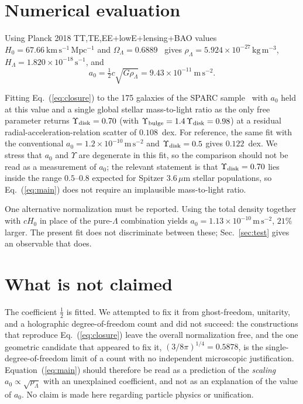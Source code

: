 \documentclass[aps,prd,reprint,amsmath,amssymb,nofootinbib,superscriptaddress]{revtex4-2}
\begin{document}
\section{Numerical evaluation}
\label{sec:num}

Using Planck 2018 TT,TE,EE+lowE+lensing+BAO values $H_0 = 67.66\ \mathrm{km\,s^{-1}\,Mpc^{-1}}$ and
$\Omega_\Lambda = 0.6889$~\cite{Planck2018} gives
$\rho_\Lambda = 5.924\times10^{-27}\,\mathrm{kg\,m^{-3}}$, $H_\Lambda = 1.820\times10^{-18}\,\mathrm{s^{-1}}$,
and
\begin{equation}
a_0 = \tfrac12 c\sqrt{G\rho_\Lambda} = 9.43\times10^{-11}\ \mathrm{m\,s^{-2}} .
\end{equation}

Fitting Eq.~(\ref{eq:closure}) to the 175 galaxies of the SPARC sample~\cite{SPARC} with $a_0$ held at
this value and a single global stellar mass-to-light ratio as the only free parameter returns
$\Upsilon_{\rm disk} = 0.70$ (with $\Upsilon_{\rm bulge} = 1.4\,\Upsilon_{\rm disk} = 0.98$) at a
residual radial-acceleration-relation scatter of $0.108$~dex. For reference, the same fit with the
conventional $a_0 = 1.2\times10^{-10}\,\mathrm{m\,s^{-2}}$ and $\Upsilon_{\rm disk} = 0.5$ gives
$0.122$~dex. We stress that $a_0$ and $\Upsilon$ are degenerate in this fit, so the comparison should
not be read as a measurement of $a_0$; the relevant statement is that
$\Upsilon_{\rm disk} = 0.70$ lies inside the range $0.5$--$0.8$ expected for Spitzer $3.6\,\mu$m
stellar populations, so Eq.~(\ref{eq:main}) does not require an implausible mass-to-light ratio.

One alternative normalization must be reported. Using the total density together with $cH_0$ in place of
the pure-$\Lambda$ combination yields $a_0 = 1.13\times10^{-10}\,\mathrm{m\,s^{-2}}$, $21\%$ larger.
The present fit does not discriminate between these; Sec.~\ref{sec:test} gives an observable that does.

\section{What is not claimed}

The coefficient $\tfrac12$ is fitted. We attempted to fix it from ghost-freedom, unitarity, and a
holographic degree-of-freedom count and did not succeed: the constructions that reproduce
Eq.~(\ref{eq:closure}) leave the overall normalization free, and the one geometric candidate that
appeared to fix it, $(3/8\pi)^{1/4} = 0.5878$, is the single-degree-of-freedom limit of a count with no
independent microscopic justification. Equation~(\ref{eq:main}) should therefore be read as a
prediction of the \emph{scaling} $a_0\propto\sqrt{\rho_\Lambda}$ with an unexplained coefficient, and
not as an explanation of the value of $a_0$. No claim is made here regarding particle physics or
unification.
\end{document}
